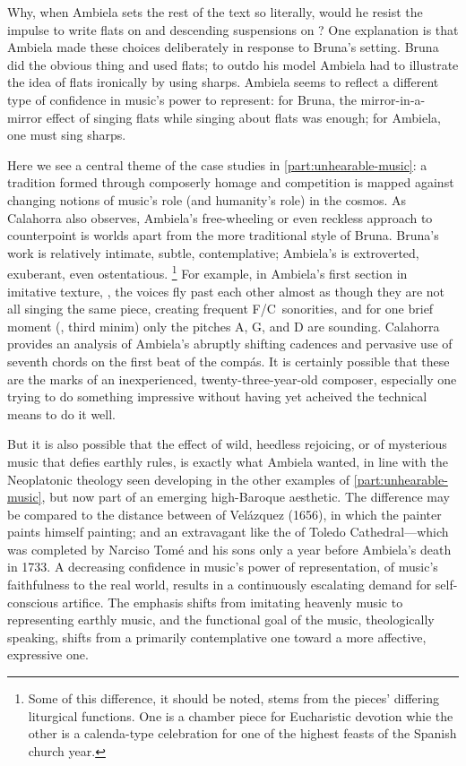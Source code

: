 Why, when Ambiela sets the rest of the text so literally, would he resist the impulse to write flats on  and descending suspensions on ?
One explanation is that Ambiela made these choices deliberately in response to Bruna's setting. 
Bruna did the obvious thing and used flats; to outdo his model Ambiela had to illustrate the idea of flats ironically by using sharps. 
Ambiela seems to reflect a different type of confidence in music's power to represent: for Bruna, the mirror-in-a-mirror effect of singing flats while singing about flats was enough; for Ambiela, one must sing sharps. 

Here we see a central theme of the case studies in \cref{part:unhearable-music}: a tradition formed through composerly homage and competition is mapped against changing notions of music's role (and humanity's role) in the cosmos. 
As Calahorra also observes, Ambiela's free-wheeling or even reckless approach to counterpoint is worlds apart from the more traditional style of Bruna.
Bruna's work is relatively intimate, subtle, contemplative; Ambiela's is extroverted, exuberant, even ostentatious.%
	\footnote{%
	Some of this difference, it should be noted, stems from the pieces' differing liturgical functions. 
	One is a chamber piece for Eucharistic devotion whie the other is a calenda-type celebration for one of the highest feasts of the Spanish church year.
	}
For example, in Ambiela's first section in imitative texture, , the voices fly past each other almost as though they are not all singing the same piece, creating frequent F\na/C\sh\ sonorities, and for one brief moment (, third minim) only the pitches A, G, and D are sounding.
Calahorra provides an analysis of Ambiela's abruptly shifting cadences and pervasive use of seventh chords on the first beat of the compás.
It is certainly possible that these are the marks of an inexperienced, twenty-three-year-old composer, especially one trying to do something impressive without having yet acheived the technical means to do it well.

But it is also possible that the effect of wild, heedless rejoicing, or of mysterious music that defies earthly rules, is exactly what Ambiela wanted, in line with the Neoplatonic theology seen developing in the other examples of \cref{part:unhearable-music}, but now part of an emerging high-Baroque aesthetic.
The difference may be compared to the distance between  of Velázquez (1656), in which the painter paints himself painting; and an extravagant  like the  of Toledo Cathedral---which was completed by Narciso Tomé and his sons only a year before Ambiela's death in 1733.
A decreasing confidence in music's power of representation, of music's faithfulness to the real world, results in a continuously escalating demand for self-conscious artifice.
The emphasis shifts from imitating heavenly music to representing earthly music, and the functional goal of the music, theologically speaking, shifts from a primarily contemplative one toward a more affective, expressive one.

